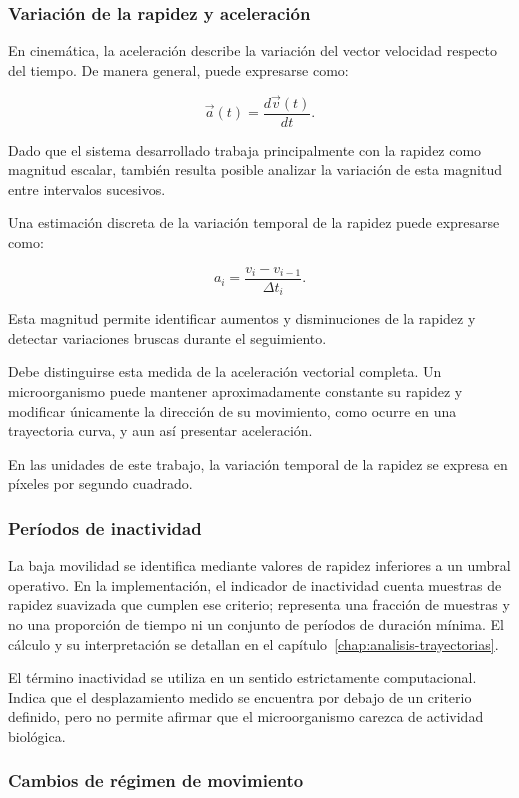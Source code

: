 \subsubsection{Variación de la rapidez y aceleración}

En cinemática, la aceleración describe la variación del vector velocidad respecto del tiempo. De manera general, puede expresarse como:

\[
\vec{a}(t)=\frac{d\vec{v}(t)}{dt}.
\]

Dado que el sistema desarrollado trabaja principalmente con la rapidez como magnitud escalar, también resulta posible analizar la variación de esta magnitud entre intervalos sucesivos.

Una estimación discreta de la variación temporal de la rapidez puede expresarse como:

\[
a_i=\frac{v_i-v_{i-1}}{\Delta t_i}.
\]

Esta magnitud permite identificar aumentos y disminuciones de la rapidez y detectar variaciones bruscas durante el seguimiento.

Debe distinguirse esta medida de la aceleración vectorial completa. Un microorganismo puede mantener aproximadamente constante su rapidez y modificar únicamente la dirección de su movimiento, como ocurre en una trayectoria curva, y aun así presentar aceleración.

En las unidades de este trabajo, la variación temporal de la rapidez se expresa en píxeles por segundo cuadrado.

\subsubsection{Períodos de inactividad}

La baja movilidad se identifica mediante valores de rapidez inferiores a un umbral operativo. En la implementación, el indicador de inactividad cuenta muestras de rapidez suavizada que cumplen ese criterio; representa una fracción de muestras y no una proporción de tiempo ni un conjunto de períodos de duración mínima. El cálculo y su interpretación se detallan en el capítulo~\ref{chap:analisis-trayectorias}.

El término inactividad se utiliza en un sentido estrictamente computacional. Indica que el desplazamiento medido se encuentra por debajo de un criterio definido, pero no permite afirmar que el microorganismo carezca de actividad biológica.

\subsubsection{Cambios de régimen de movimiento}

